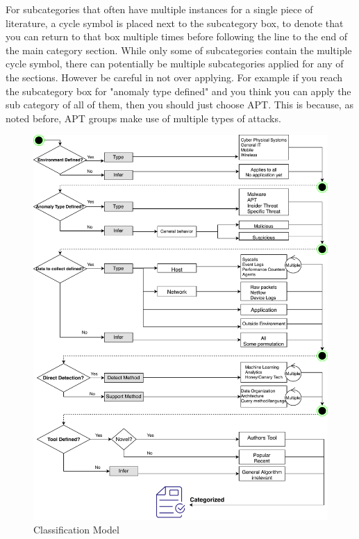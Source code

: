 For subcategories that often have multiple instances for a single piece of literature, a cycle symbol is placed next to the subcategory box, to denote that you can return to that box multiple times before following the line to the end of the main category section. 
While only some of subcategories contain the multiple cycle symbol, there can potentially be multiple subcategories applied for any of the sections. 
However be careful in not over applying. For example if you reach the subcategory box for "anomaly type defined" and you think you can apply the sub category of all of them, then you should just choose APT. 
This is because, as noted before, APT groups make use of multiple types of attacks.
\begin{figure}
  \includegraphics[width=\textwidth]{logicdiagram.pdf}
  \caption{Classification Model }
  \label{fig-model}
\end{figure}
